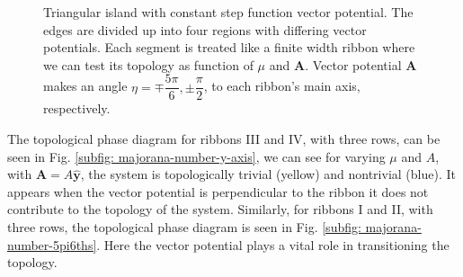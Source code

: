 \documentclass[aps,prb,showpacs,amsmath,twocolumn,amssymb,superscriptaddress]{revtex4-2}
\let\oldhat\hat
\renewcommand{\hat}[1]{\oldhat{\mathbf{#1}}}
\renewcommand{\vec}[1]{\mathbf{#1}}
\begin{document}
\begin{figure}[]
  \caption{Triangular island with constant step function vector potential. The edges are divided up into four regions with differing vector potentials. Each segment is treated like a finite width ribbon where we can test its topology as function of $\mu$ and $\vec{A}$. Vector potential $\vec{A}$ makes an angle $\eta =  \mp \dfrac{5\pi}{6}, \pm \dfrac{\pi}{2}$, to each ribbon's main axis, respectively.}
  \label{fig: triangular-island-vector-potential-divided}
\end{figure}

The topological phase diagram for ribbons III and IV, with three rows, can be seen in Fig. \ref{subfig: majorana-number-y-axis}, we can see for varying $\mu$ and $A$, with $\vec{A} = A\hat{y}$, the system is topologically trivial (yellow) and nontrivial (blue).
It appears when the vector potential is perpendicular to the ribbon it does not contribute to the topology of the system.
Similarly, for ribbons I and II, with three rows, the topological phase diagram is seen in Fig. \ref{subfig: majorana-number-5pi6ths}.
Here the vector potential plays a vital role in transitioning the topology.
\end{document}
